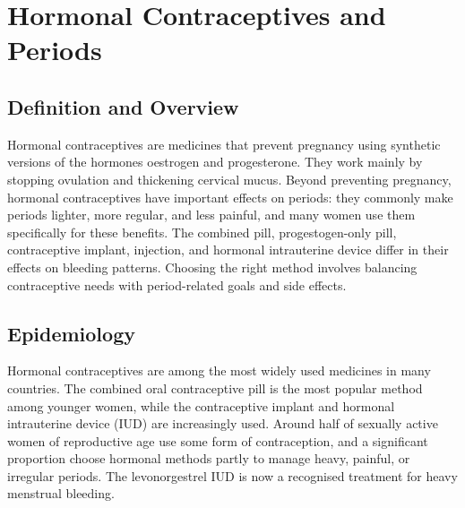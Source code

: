 \chapter{Hormonal Contraceptives and Periods}

\section*{Definition and Overview}
Hormonal contraceptives are medicines that prevent pregnancy using synthetic versions of the hormones oestrogen and progesterone. They work mainly by stopping ovulation and thickening cervical mucus. Beyond preventing pregnancy, hormonal contraceptives have important effects on periods: they commonly make periods lighter, more regular, and less painful, and many women use them specifically for these benefits. The combined pill, progestogen-only pill, contraceptive implant, injection, and hormonal intrauterine device differ in their effects on bleeding patterns. Choosing the right method involves balancing contraceptive needs with period-related goals and side effects.

\section*{Epidemiology}
Hormonal contraceptives are among the most widely used medicines in many countries. The combined oral contraceptive pill is the most popular method among younger women, while the contraceptive implant and hormonal intrauterine device (IUD) are increasingly used. Around half of sexually active women of reproductive age use some form of contraception, and a significant proportion choose hormonal methods partly to manage heavy, painful, or irregular periods. The levonorgestrel IUD is now a recognised treatment for heavy menstrual bleeding.

